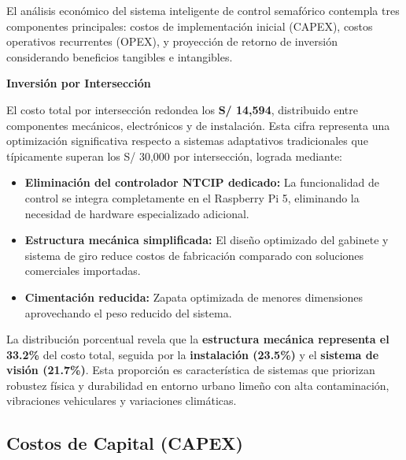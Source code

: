 \documentclass[12pt,a4paper,oneside]{report}
\begin{document}
El análisis económico del sistema inteligente de control semafórico contempla tres componentes principales: costos de implementación inicial (CAPEX), costos operativos recurrentes (OPEX), y proyección de retorno de inversión considerando beneficios tangibles e intangibles.

\textbf{Inversión por Intersección}

El costo total por intersección redondea los \textbf{S/ 14,594}, distribuido entre componentes mecánicos, electrónicos y de instalación. Esta cifra representa una optimización significativa respecto a sistemas adaptativos tradicionales que típicamente superan los S/ 30,000 por intersección, lograda mediante:

\begin{itemize}
\item
  \textbf{Eliminación del controlador NTCIP dedicado:} La funcionalidad de control se integra completamente en el Raspberry Pi 5, eliminando la necesidad de hardware especializado adicional.
\end{itemize}

\begin{itemize}
\item
  \textbf{Estructura mecánica simplificada:} El diseño optimizado del gabinete y sistema de giro reduce costos de fabricación comparado con soluciones comerciales importadas.
\end{itemize}

\begin{itemize}
\item
  \textbf{Cimentación reducida:} Zapata optimizada de menores dimensiones aprovechando el peso reducido del sistema.
\end{itemize}

La distribución porcentual revela que la \textbf{estructura mecánica representa el 33.2\%} del costo total, seguida por la \textbf{instalación (23.5\%)} y el \textbf{sistema de visión (21.7\%)}. Esta proporción es característica de sistemas que priorizan robustez física y durabilidad en entorno urbano limeño con alta contaminación, vibraciones vehiculares y variaciones climáticas.

\subsection{Costos de Capital (CAPEX)}\label{costos-de-capital-capex}

\label{tbl:7.1}
\end{document}

